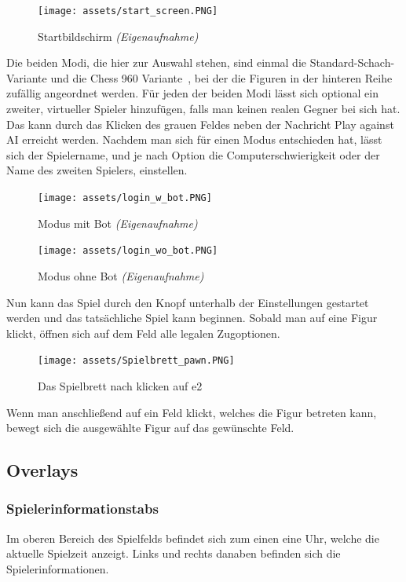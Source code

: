\documentclass[a4paper, 10pt]{scrartcl}
\begin{document}
\begin{figure}[h]
        \centering
        \texttt{[image: assets/start\_screen.PNG]}
        \caption{Startbildschirm \textit{(Eigenaufnahme)}}
\end{figure}
Die beiden Modi, die hier zur Auswahl stehen, sind einmal die Standard-Schach-Variante und die Chess 960 Variante~\cite{chess960},
bei der die Figuren in der hinteren Reihe zufällig angeordnet werden.
Für jeden der beiden Modi lässt sich optional ein zweiter, virtueller Spieler hinzufügen, falls man keinen realen Gegner bei sich hat.
Das kann durch das Klicken des grauen Feldes neben der Nachricht \glqq{}Play against AI\grqq{} erreicht werden.
Nachdem man sich für einen Modus entschieden hat, lässt sich der Spielername, und je nach Option die Computerschwierigkeit oder der Name des zweiten Spielers, einstellen.
\begin{figure}[!h]
        \centering
        \begin{minipage}[b]{.4\linewidth} %
           \texttt{[image: assets/login\_w\_bot.PNG]}
           \caption{Modus mit Bot \textit{(Eigenaufnahme)}}
        \end{minipage}
        \hspace{.1\linewidth}%
        \begin{minipage}[b]{.4\linewidth} %
           \texttt{[image: assets/login\_wo\_bot.PNG]}
           \caption{Modus ohne Bot \textit{(Eigenaufnahme)}}
        \end{minipage}
\end{figure}

Nun kann das Spiel durch den Knopf unterhalb der Einstellungen gestartet werden und das tatsächliche Spiel kann beginnen.
Sobald man auf eine Figur klickt, öffnen sich auf dem Feld alle legalen Zugoptionen.

\begin{figure}[h]
        \centering
        \texttt{[image: assets/Spielbrett\_pawn.PNG]}
        \caption{Das Spielbrett nach klicken auf e2}
\end{figure}
Wenn man anschließend auf ein Feld klickt, welches die Figur betreten kann, bewegt
sich die ausgewählte Figur auf das gewünschte Feld.

\subsection{Overlays}

\subsubsection*{Spielerinformationstabs}
Im oberen Bereich des Spielfelds befindet sich zum einen eine Uhr, welche die aktuelle Spielzeit anzeigt. Links und rechts danaben befinden sich die Spielerinformationen.
\end{document}
